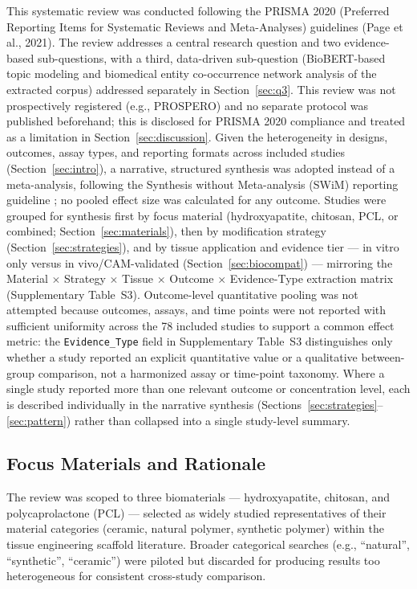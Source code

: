 \documentclass[5p,times,twocolumn]{elsarticle}
\begin{document}
This systematic review was conducted following the PRISMA 2020 (Preferred Reporting Items for Systematic Reviews and Meta-Analyses) guidelines (Page et al., 2021). The review addresses a central research question and two evidence-based sub-questions, with a third, data-driven sub-question (BioBERT-based topic modeling and biomedical entity co-occurrence network analysis of the extracted corpus) addressed separately in Section~\ref{sec:q3}. This review was not prospectively registered (e.g., PROSPERO) and no separate protocol was published beforehand; this is disclosed for PRISMA 2020 compliance and treated as a limitation in Section~\ref{sec:discussion}. Given the heterogeneity in designs, outcomes, assay types, and reporting formats across included studies (Section~\ref{sec:intro}), a narrative, structured synthesis was adopted instead of a meta-analysis, following the Synthesis without Meta-analysis (SWiM) reporting guideline \cite{ref86}; no pooled effect size was calculated for any outcome. Studies were grouped for synthesis first by focus material (hydroxyapatite, chitosan, PCL, or combined; Section~\ref{sec:materials}), then by modification strategy (Section~\ref{sec:strategies}), and by tissue application and evidence tier --- in vitro only versus in vivo/CAM-validated (Section~\ref{sec:biocompat}) --- mirroring the Material $\times$ Strategy $\times$ Tissue $\times$ Outcome $\times$ Evidence-Type extraction matrix (Supplementary Table~S3). Outcome-level quantitative pooling was not attempted because outcomes, assays, and time points were not reported with sufficient uniformity across the 78 included studies to support a common effect metric: the \texttt{Evidence\_Type} field in Supplementary Table~S3 distinguishes only whether a study reported an explicit quantitative value or a qualitative between-group comparison, not a harmonized assay or time-point taxonomy. Where a single study reported more than one relevant outcome or concentration level, each is described individually in the narrative synthesis (Sections~\ref{sec:strategies}--\ref{sec:pattern}) rather than collapsed into a single study-level summary.

\subsection{Focus Materials and Rationale}

The review was scoped to three biomaterials --- hydroxyapatite, chitosan, and polycaprolactone (PCL) --- selected as widely studied representatives of their material categories (ceramic, natural polymer, synthetic polymer) within the tissue engineering scaffold literature. Broader categorical searches (e.g., ``natural'', ``synthetic'', ``ceramic'') were piloted but discarded for producing results too heterogeneous for consistent cross-study comparison.
\end{document}
